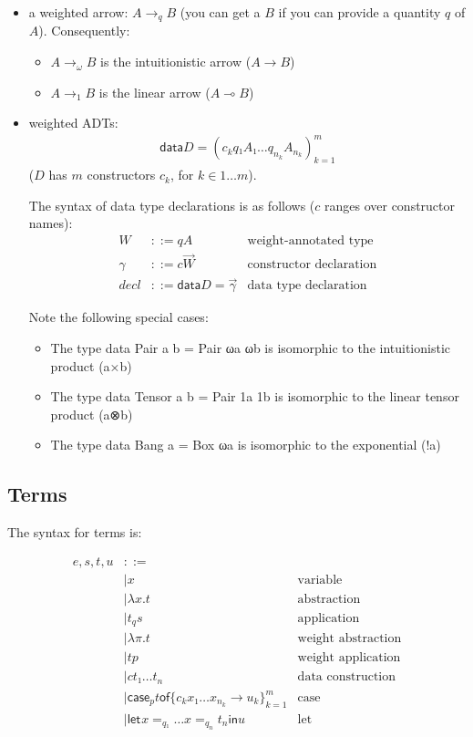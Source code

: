 \documentclass[11pt]{article}
\newcommand{\case}[3][]{\mathsf{case}_{#1} #2 \mathsf{of} \{#3\}^m_{k=1}}
\newcommand{\flet}[1][]{\mathsf{let}_{#1} }
\newcommand{\fin}{ \mathsf{in} }
\begin{document}
\begin{itemize}
\item a weighted arrow: \(A →_q B\) (you can get a \(B\) if you can provide a
quantity \(q\) of \(A\)). Consequently:
\begin{itemize}
\item \(A →_ω B\) is the intuitionistic arrow (\(A → B\))
\item \(A →_1 B\) is the linear arrow (\(A ⊸ B\))
\end{itemize}
\item weighted ADTs:
\begin{align*}
\mathsf{data} D = \left(c_k  q₁ A₁  …  q_{n_k} A_{n_k}\right)^m_{k=1}
\end{align*}
(\(D\) has \(m\) constructors \(c_k\), for \(k ∈ 1…m\)).

The syntax of data type declarations is as follows ($c$ ranges over constructor names):
\begin{align*}
  W &::= qA &\text{weight-annotated type}\\
  γ &::= c  \vec{W}&\text{constructor declaration}\\
  decl &::= \mathsf{data } D = \vec{γ}&\text{data type declaration}
\end{align*}

Note the following special cases:
\begin{itemize}
\item The type data Pair a b = Pair ωa ωb is isomorphic to the intuitionistic product (a×b)
\item The type data Tensor a b = Pair 1a 1b is isomorphic to the linear tensor product (a⊗b)
\item The type data Bang a = Box ωa is isomorphic to the exponential (!a)
\end{itemize}
\end{itemize}

\subsection{Terms}
\label{sec:orgheadline3}

The syntax for terms is:

\begin{align*}
e,s,t,u & ::= \\
    & |  x & \text{variable} \\
    & |  λx. t & \text{abstraction} \\
    & |  t_q s & \text{application} \\
    & |  λπ. t & \text{weight abstraction} \\
    & |  t p & \text{weight application} \\
    & |  c t₁ … t_n & \text{data construction} \\
    & |  \case[p] t {c_k  x₁ … x_{n_k} → u_k}  & \text{case} \\
    & |  \flet x =_{q₁} … x =_{q_n} t_n \fin u & \text{let}
\end{align*}
\end{document}
